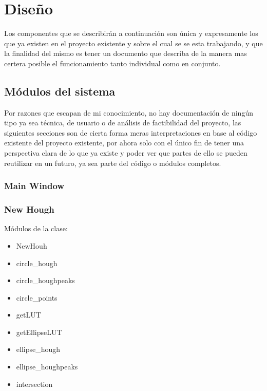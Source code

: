 \documentclass[12pt]{article} %
\begin{document}
	
\section{Diseño}
	Los componentes que se describirán a continuación son única y expresamente los que ya existen en el proyecto existente y sobre el cual se 
    se esta trabajando, y que la finalidad del mismo es tener un documento que describa de la manera mas certera posible el funcionamiento 
    tanto individual como en conjunto.
    
    \subsection{Módulos del sistema}
    	Por razones que escapan de mi conocimiento, no hay documentación de ningún tipo ya sea técnica, de usuario o de análisis de factibilidad
        del proyecto, las siguientes secciones son de cierta forma meras interpretaciones en base al código existente del proyecto existente, por
        ahora solo con el único fin de tener una perspectiva clara de lo que ya existe y poder ver que partes de ello se pueden reutilizar en un
        futuro, ya sea parte del código o módulos completos.
        
        \subsubsection{Main Window}
        
        \subsubsection{New Hough}
        	Módulos de la clase: \vspace{1cm}
            	\begin{itemize}
                	\item NewHouh
                    \item circle\_hough
                    \item circle\_houghpeaks
                    \item circle\_points
                    \item getLUT
                    \item getEllipseLUT
                    \item ellipse\_hough
                    \item ellipse\_houghpeaks
                    \item intersection
                    
				\end{itemize}
\end{document}
